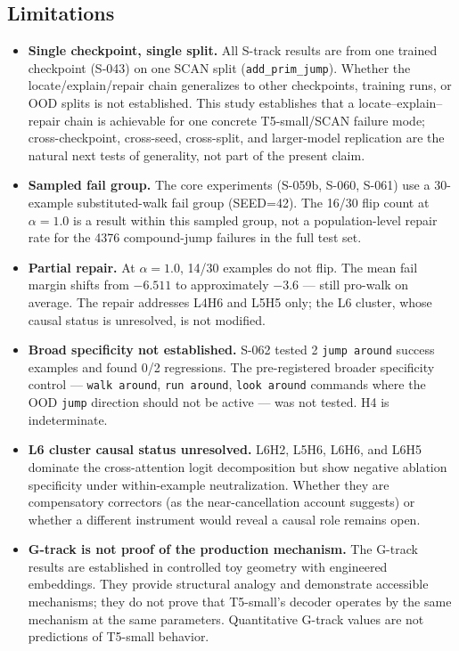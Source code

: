 \subsection{Limitations}

\begin{itemize}
  \item \textbf{Single checkpoint, single split.}
    All S-track results are from one trained checkpoint (S-043) on one SCAN split
    (\texttt{add\_prim\_jump}).
    Whether the locate/explain/repair chain generalizes to other checkpoints, training
    runs, or OOD splits is not established.
    This study establishes that a locate--explain--repair chain is achievable for one
    concrete T5-small/SCAN failure mode; cross-checkpoint, cross-seed, cross-split, and
    larger-model replication are the natural next tests of generality, not part of the
    present claim.

  \item \textbf{Sampled fail group.}
    The core experiments (S-059b, S-060, S-061) use a 30-example substituted-walk fail
    group (SEED=42).
    The 16/30 flip count at $\alpha=1.0$ is a result within this sampled group, not a
    population-level repair rate for the 4376 compound-jump failures in the full test set.

  \item \textbf{Partial repair.}
    At $\alpha=1.0$, 14/30 examples do not flip.
    The mean fail margin shifts from $-6.511$ to approximately $-3.6$ --- still pro-walk
    on average.
    The repair addresses L4H6 and L5H5 only; the L6 cluster, whose causal status is
    unresolved, is not modified.

  \item \textbf{Broad specificity not established.}
    S-062 tested 2 \texttt{jump around} success examples and found 0/2 regressions.
    The pre-registered broader specificity control --- \texttt{walk around},
    \texttt{run around}, \texttt{look around} commands where the OOD \texttt{jump}
    direction should not be active --- was not tested.
    H4 is indeterminate.

  \item \textbf{L6 cluster causal status unresolved.}
    L6H2, L5H6, L6H6, and L6H5 dominate the cross-attention logit decomposition but
    show negative ablation specificity under within-example neutralization.
    Whether they are compensatory correctors (as the near-cancellation account suggests)
    or whether a different instrument would reveal a causal role remains open.

  \item \textbf{G-track is not proof of the production mechanism.}
    The G-track results are established in controlled toy geometry with engineered
    embeddings.
    They provide structural analogy and demonstrate accessible mechanisms; they do not
    prove that T5-small's decoder operates by the same mechanism at the same parameters.
    Quantitative G-track values are not predictions of T5-small behavior.
\end{itemize}

